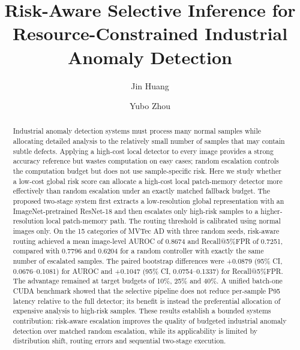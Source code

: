 \documentclass[preprint,12pt]{elsarticle}
\begin{document}
\begin{frontmatter}

\title{Risk-Aware Selective Inference for Resource-Constrained Industrial Anomaly Detection}

\author[guangxi]{Jin Huang}

\author[shangqiu]{Yubo Zhou}




\begin{abstract}
Industrial anomaly detection systems must process many normal samples while allocating detailed analysis to the relatively small number of samples that may contain subtle defects. Applying a high-cost local detector to every image provides a strong accuracy reference but wastes computation on easy cases; random escalation controls the computation budget but does not use sample-specific risk. Here we study whether a low-cost global risk score can allocate a high-cost local patch-memory detector more effectively than random escalation under an exactly matched fallback budget. The proposed two-stage system first extracts a low-resolution global representation with an ImageNet-pretrained ResNet-18 and then escalates only high-risk samples to a higher-resolution local patch-memory path. The routing threshold is calibrated using normal images only. On the 15 categories of MVTec AD with three random seeds, risk-aware routing achieved a mean image-level AUROC of 0.8674 and Recall@5\%FPR of 0.7251, compared with 0.7796 and 0.6204 for a random controller with exactly the same number of escalated samples. The paired bootstrap differences were +0.0879 (95\% CI, 0.0676--0.1081) for AUROC and +0.1047 (95\% CI, 0.0754--0.1337) for Recall@5\%FPR. The advantage remained at target budgets of 10\%, 25\% and 40\%. A unified batch-one CUDA benchmark showed that the selective pipeline does not reduce per-sample P95 latency relative to the full detector; its benefit is instead the preferential allocation of expensive analysis to high-risk samples. These results establish a bounded systems contribution: risk-aware escalation improves the quality of budgeted industrial anomaly detection over matched random escalation, while its applicability is limited by distribution shift, routing errors and sequential two-stage execution.
\end{abstract}


\end{frontmatter}
\end{document}
